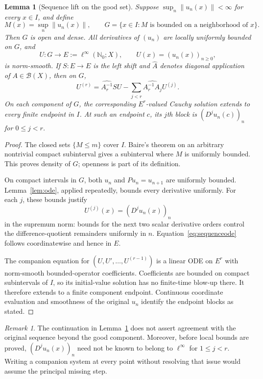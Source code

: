 \documentclass[11pt,reqno]{amsart}
\numberwithin{equation}{section}
\newtheorem{lemma}[theorem]{Lemma}
\theoremstyle{definition}
\theoremstyle{remark}
\newtheorem{remark}[theorem]{Remark}
\newcommand{\N}{\mathbb N_0}
\newcommand{\B}{\mathcal B}
\newcommand{\norm}[1]{\left\lVert #1\right\rVert}
\begin{document}
\begin{lemma}[Sequence lift on the good set]\label{lem:good}
Suppose $\sup_n\norm{u_n(x)}<\infty$ for every $x\in I$, and define
\begin{equation}\label{eq:goodset}
 M(x)=\sup_n\norm{u_n(x)},\qquad
 G=\{x\in I:M\text{ is bounded on a neighborhood of }x\}.
\end{equation}
Then $G$ is open and dense. All derivatives of $(u_n)$ are locally uniformly bounded on $G$, and
\[
 U:G\longrightarrow E:=\ell^\infty(\N;X),\qquad U(x)=(u_n(x))_{n\ge0},
\]
is norm-smooth. If $S:E\to E$ is the left shift and $\widehat A$ denotes diagonal application of $A\in\B(X)$, then on $G$,
\begin{equation}\label{eq:sequenceode}
 U^{(r)}=\widehat{A_r^{-1}}SU
       -\sum_{j<r}\widehat{A_r^{-1}A_j}U^{(j)}.
\end{equation}
On each component of $G$, the corresponding $E^r$-valued Cauchy solution extends to every finite endpoint in $I$. At such an endpoint $c$, its $j$th block is $(D^ju_n(c))_n$ for $0\le j<r$.
\end{lemma}
\begin{proof}
The closed sets $\{M\le m\}$ cover $I$. Baire's theorem on an arbitrary nontrivial compact subinterval gives a subinterval where $M$ is uniformly bounded. This proves density of $G$; openness is part of its definition.

On compact intervals in $G$, both $u_n$ and $Pu_n=u_{n+1}$ are uniformly bounded. Lemma~\ref{lem:ode}, applied repeatedly, bounds every derivative uniformly. For each $j$, these bounds justify
\[
 U^{(j)}(x)=(D^ju_n(x))_n
\]
in the supremum norm: bounds for the next two scalar derivative orders control the difference-quotient remainders uniformly in $n$. Equation~\eqref{eq:sequenceode} follows coordinatewise and hence in $E$.

The companion equation for $(U,U',\ldots,U^{(r-1)})$ is a linear ODE on $E^r$ with norm-smooth bounded-operator coefficients. Coefficients are bounded on compact subintervals of $I$, so its initial-value solution has no finite-time blow-up there. It therefore extends to a finite component endpoint. Continuous coordinate evaluation and smoothness of the original $u_n$ identify the endpoint blocks as stated.
\end{proof}

\begin{remark}\label{rem:notglobal}
The continuation in Lemma~\ref{lem:good} does not assert agreement with the original sequence beyond the good component. Moreover, before local bounds are proved, $(D^ju_n(x))_n$ need not be known to belong to $\ell^\infty$ for $1\le j<r$. Writing a companion system at every point without resolving that issue would assume the principal missing step.
\end{remark}
\end{document}
